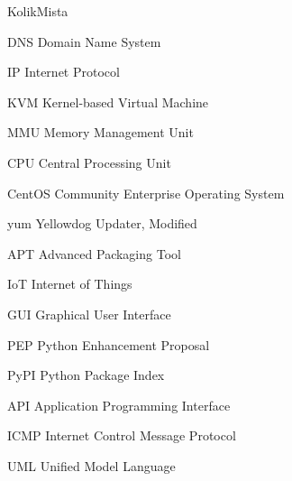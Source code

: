\begin{seznamzkratek}{KolikMista}

		{DNS}
		{Domain Name System}
		
		{IP}
		{Internet Protocol}
		
		{KVM}
		{Kernel-based Virtual Machine}
		
		{MMU}
		{Memory Management Unit}
		
		{CPU}
		{Central Processing Unit}
		
		{CentOS}
		{Community Enterprise Operating System}


		{yum}
		{Yellowdog Updater, Modified}

		{APT}
		{Advanced Packaging Tool}
		
		{IoT}
		{Internet of Things}

		{GUI}
		{Graphical User Interface}
		
		{PEP}
		{Python Enhancement Proposal}	
		
		{PyPI}
		{Python Package Index}	
		
		{API}
		{Application Programming Interface}		
		
		{ICMP}
		{Internet Control Message Protocol}				

		{UML}
		{Unified Model Language}		
		

\end{seznamzkratek}
